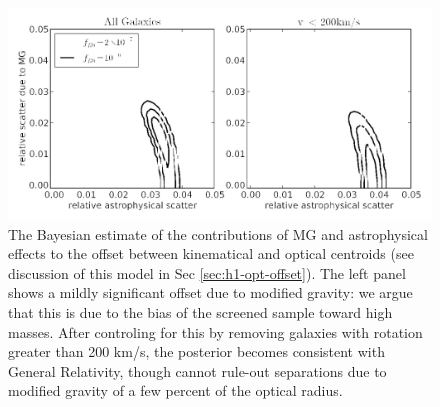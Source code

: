 \documentclass[useAMS,usenatbib,twocolumn]{mn2e}
\begin{document}
\begin{figure}
\begin{center}
  \includegraphics[scale=0.3]{figures/sec4_2_offset.png}
  \caption{The Bayesian estimate of the contributions of MG and astrophysical
effects to the offset between kinematical and optical centroids
(see discussion of this model in Sec \ref{sec:h1-opt-offset}).  The left
    panel shows a mildly significant offset due to modified gravity:
    we argue that this is due to the bias of the screened sample toward
    high masses.  After controling for this by removing galaxies
    with rotation greater than 200 km/s, the posterior becomes
    consistent with General Relativity, though cannot rule-out
    separations due to modified gravity of a few percent of the optical
    radius.}
  \label{offset-kin-den-2}
\end{center}
\end{figure}
\end{document}

